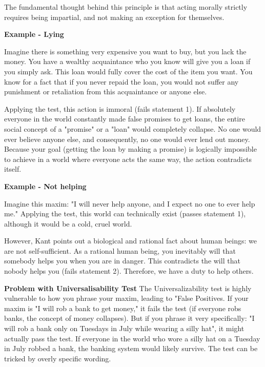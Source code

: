 \documentclass[12pt]{article}
\begin{document}
\noindent The fundamental thought behind this principle is that acting morally strictly requires being impartial, and not making an exception for themselves.

\noindent\textbf{Example - Lying}

\noindent Imagine there is something very expensive you want to buy, but you lack the money.
You have a wealthy acquaintance who you know will give you a loan if you simply ask.
This loan would fully cover the cost of the item you want.
You know for a fact that if you never repaid the loan, you would not suffer any punishment or retaliation from this acquaintance or anyone else.

\noindent Applying the test, this action is immoral (fails statement 1).
If absolutely everyone in the world constantly made false promises to get loans, the entire social concept of a "promise" or a "loan" would completely collapse. No one would ever believe anyone else, and consequently, no one would ever lend out money.
Because your goal (getting the loan by making a promise) is logically impossible to achieve in a world where everyone acts the same way, the action contradicts itself.

\noindent\textbf{Example - Not helping}

\noindent Imagine this maxim: "I will never help anyone, and I expect no one to ever help me."
Applying the test, this world can technically exist (passes statement 1), although it would be a cold, cruel world.

\noindent However, Kant points out a biological and rational fact about human beings: we are not self-sufficient.
As a rational human being, you inevitably will that somebody helps you when you are in danger.
This contradicts the will that nobody helps you (fails statement 2).
Therefore, we have a duty to help others.

\vspace{1em}
\noindent\textbf{Problem with Universalisability Test}
The Universalizability test is highly vulnerable to how you phrase your maxim, leading to "False Positives.
If your maxim is "I will rob a bank to get money," it fails the test (if everyone robs banks, the concept of money collapses).
But if you phrase it very specifically: "I will rob a bank only on Tuesdays in July while wearing a silly hat", it might actually pass the test.
If everyone in the world who wore a silly hat on a Tuesday in July robbed a bank, the banking system would likely survive.
The test can be tricked by overly specific wording.
\end{document}
